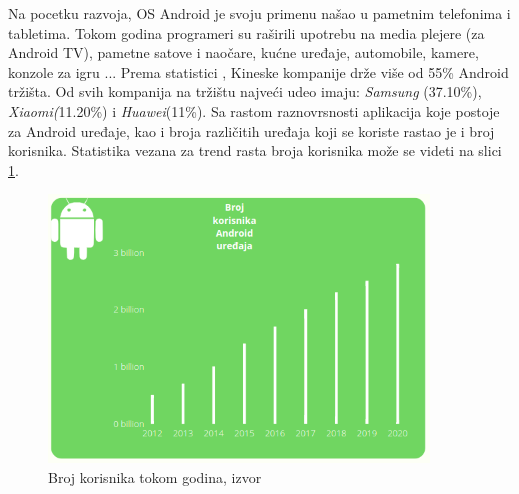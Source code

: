 \documentclass[android.tex]{subfiles}
\begin{document}
Na pocetku razvoja, OS Android je svoju primenu našao u pametnim telefonima i tabletima. Tokom godina programeri su raširili upotrebu na media plejere (za Android TV), pametne satove i naočare, kućne uređaje, automobile, kamere, konzole za igru \cite{sajt:androidDevelopers}...   Prema statistici \cite{sajt:statistika}, Kineske kompanije drže više od 55\% Android tržišta. Od svih kompanija na tržištu najveći udeo imaju:\textit{ Samsung} (37.10\%), \textit{Xiaomi(}11.20\%) i \textit{Huawei}(11\%). Sa rastom raznovrsnosti aplikacija koje postoje za Android uređaje, kao i broja različitih uređaja koji se koriste rastao je i broj korisnika. Statistika vezana za trend rasta broja korisnika može se videti na slici \ref{fig:brKorisnika}.

\begin{figure}[!ht]
  \centering
  \label{fig:brKorisnika}
  \includegraphics[width=0.9\textwidth]{brKorisnika.png}
  \caption{Broj korisnika tokom godina, izvor \cite{sajt:statistika}}
\end{figure}
\end{document}
